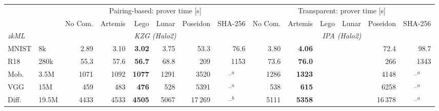 \providecommand{\cpFill}{\ifdefined\cellcolor\cellcolor{gray!15}\fi}
\providecommand{\cpFillLegend}{\ifdefined\cellcolor\colorbox{gray!15}{\strut\itshape shaded}\else\textit{grey text}\fi}
\providecommand{\cpUnsupported}[1]{{\color{black!65}\footnotesize\itshape #1}}
\providecommand{\cpUnsupportedShort}{{\color{black!65}$\bot$}}
\providecommand{\cpNotImpl}[1]{{\color{gray}\footnotesize\itshape #1}}
\providecommand{\cpNotImplShort}{{\color{black!65}$\bot$}}
\providecommand{\cpNotRun}{{\color{gray}--}}
\begin{table}[t]
\centering
\small
\setlength{\tabcolsep}{2.5pt}
\begin{tabular}{ll@{\hspace{6.0pt}}rrrrrr@{\hspace{6.0pt}}rrrrrr}
\toprule
 &  & \multicolumn{6}{c}{Pairing-based: prover time [s]} & \multicolumn{6}{c}{Transparent: prover time [s]} \\
\cmidrule(lr){3-8} \cmidrule(lr){9-14}
 &  & No Com. & Artemis & Lego & Lunar & Poseidon & SHA-256 & No Com. & Artemis & Lego & Lunar & Poseidon & SHA-256 \\
\midrule
\multicolumn{2}{l}{\textit{zkML}} & \multicolumn{6}{c}{\textit{KZG (Halo2)}} & \multicolumn{6}{c}{\textit{IPA (Halo2)}} \\
\cmidrule(lr){3-14}
MNIST & {\scriptsize 8k} & 2.89 & 3.10 & \textbf{3.02} & 3.75 & 53.3 & 76.6 & 3.80 & \textbf{4.06} & \multicolumn{2}{c}{\cpFill} & 72.4 & 98.7 \\
R18 & {\scriptsize 280k} & 55.3 & 57.6 & \textbf{56.7} & 68.8 & 209 & 1153 & 73.6 & \textbf{76.0} & \multicolumn{2}{c}{\cpFill} & 266 & 1343 \\
Mob. & {\scriptsize 3.5M} & 1071 & 1092 & \textbf{1077} & 1291 & 3520 & \multicolumn{1}{c}{\cpNotRun$^{a}$} & 1286 & \textbf{1323} & \multicolumn{2}{c}{\cpFill} & 4148 & \multicolumn{1}{c}{\cpNotRun$^{a}$} \\
VGG & {\scriptsize 15M} & 459 & 483 & \textbf{476} & 528 & 5391 & \multicolumn{1}{c}{\cpNotRun$^{a}$} & 538 & \textbf{615} & \multicolumn{2}{c}{\cpFill} & 6258 & \multicolumn{1}{c}{\cpNotRun$^{a}$} \\
Diff. & {\scriptsize 19.5M} & 4433 & 4533 & \textbf{4505} & 5067 & 17\,269 & \multicolumn{1}{c}{\cpNotRun$^{b}$} & 5111 & \textbf{5358} & \multicolumn{2}{c}{\cpFill} & 16\,378 & \multicolumn{1}{c}{\cpNotRun$^{a}$} \\

\end{tabular}
\end{table}

